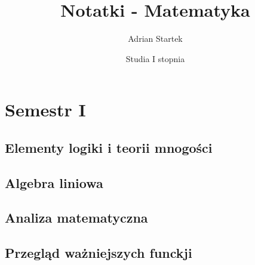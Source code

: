 \documentclass[fleqn]{book}
\title{Notatki - Matematyka}
\author{Adrian Startek}
\date{Studia I stopnia}
\begin{document}
    \frontmatter
    \maketitle
    \tableofcontents
    \mainmatter
    \part{Semestr I}
    \chapter{Elementy logiki i teorii mnogości}
    
    \chapter{Algebra liniowa}
    
    \chapter{Analiza matematyczna}
    \appendix
    \chapter{Przegląd ważniejszych funckji}
    
    \printindex
\end{document}
